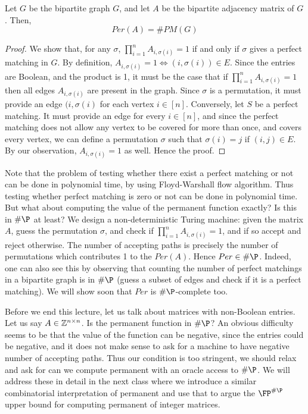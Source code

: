 \begin{lemma} 
Let $G$ be the bipartite graph $G$, and let $A$ be the bipartite adjacency matrix of $G$. Then,
$$Per(A)=\#PM(G)$$
\end{lemma}
\begin{proof}
We show that, for any $\sigma$, $\displaystyle\prod_{i=1}^n A_{i,\sigma(i)}=1$ if and only if $\sigma$ gives a perfect matching in $G$.  By definition, $A_{i,\sigma(i)}=1 \iff (i,\sigma(i))\in E$. Since the entries are Boolean, and the product is 1, it must be the case that if $\displaystyle\prod_{i=1}^n A_{i,\sigma(i)}=1$ then all edges $A_{i,\sigma(i)}$ are present in the graph. Since $\sigma$ is a permutation, it must provide an edge $(i, \sigma(i)$ for each vertex $i \in [n]$. Conversely, let $S$ be a perfect matching. It must provide an edge for every $i \in [n]$, and since the perfect matching does not allow any vertex to be covered for more than once, and covers every vertex, we can define a permutation $\sigma$ such that $\sigma(i) = j$ if $(i,j) \in E$. By our observation, $A_{i,\sigma(i)}=1$ as well. Hence the proof.
\end{proof}

Note that the problem of testing whether there exist a perfect matching or not can be done in polynomial time, by using Floyd-Warshall flow algorithm. Thus testing whether perfect matching is zero or not can be done in polynomial time.
But what about computing the value of the permanent function exactly? Is this in $\#\P$ at least? We design a non-deterministic Turing machine: given the matrix $A$, guess the permutation $\sigma$, and check if $\displaystyle\prod_{i=1}^n A_{i,\sigma(i)}=1$, and if so accept and reject otherwise. The number of accepting paths is precisely the number of permutations which contributes 1 to the $Per(A)$. Hence $Per \in \#\P$. Indeed, one can also see this by observing that counting the number of perfect matchings in a bipartite graph is in $\#\P$ (guess a subset of edges and check if it is a perfect matching). We will show soon that $Per$ is $\#\P$-complete too.

Before we end this lecture, let us talk about matrices with non-Boolean entries. Let us say $A \in {\mathbb{Z}}^{n \times n}$.
Is the permanent function in $\#\P$? An obvious difficulty seems to be that the value of the function can be negative, since the entries could be negative, and it does not make sense to ask for a machine to have negative number of accepting paths. Thus our condition is too stringent, we should relax and ask for can we compute permanent with an oracle access to $\#\P$. We will address these in detail in the next class where we introduce a similar combinatorial interpretation of permanent and use that to argue the $\FP^{\#\P}$ upper bound for computing permanent of integer matrices.

